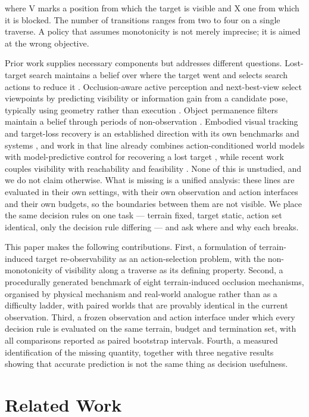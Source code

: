 \documentclass[conference]{IEEEtran}
\begin{document}
\noindent where V marks a position from which the target is visible and X one from
which it is blocked. The number of transitions ranges from two to four on a single
traverse. A policy that assumes monotonicity is not merely imprecise; it is aimed at
the wrong objective.

Prior work supplies necessary components but addresses different questions.
Lost-target search maintains a belief over where the target went and selects search
actions to reduce it \cite{RadmardCroft2016,Radmard2018}. Occlusion-aware active
perception and next-best-view select viewpoints by predicting visibility or
information gain from a candidate pose, typically using geometry rather than execution
\cite{OANBV,LEAPNBV}. Object permanence filters maintain a belief through periods of
non-observation \cite{Peng2024}. Embodied visual tracking and target-loss recovery is
an established direction with its own benchmarks and systems
\cite{TrackVLA,EVTBench}, and work in that line already combines action-conditioned
world models with model-predictive control for recovering a lost target
\cite{CSTWM}, while recent work couples visibility with reachability and feasibility
\cite{VisibleReachable}. None of this is unstudied, and we do not claim otherwise.
What is missing is a unified analysis: these lines are evaluated in their own
settings, with their own observation and action interfaces and their own budgets, so
the boundaries between them are not visible. We place the same decision rules on one
task --- terrain fixed, target static, action set identical, only the decision rule
differing --- and ask where and why each breaks.

This paper makes the following contributions. First, a formulation of terrain-induced
target re-observability as an action-selection problem, with the non-monotonicity of
visibility along a traverse as its defining property. Second, a procedurally generated
benchmark of eight terrain-induced occlusion mechanisms, organised by physical
mechanism and real-world analogue rather than as a difficulty ladder, with paired
worlds that are provably identical in the current observation. Third, a frozen
observation and action interface under which every decision rule is evaluated on the
same terrain, budget and termination set, with all comparisons reported as paired
bootstrap intervals. Fourth, a measured identification of the missing quantity,
together with three negative results showing that accurate prediction is not the same
thing as decision usefulness.

\section{Related Work}
\end{document}
